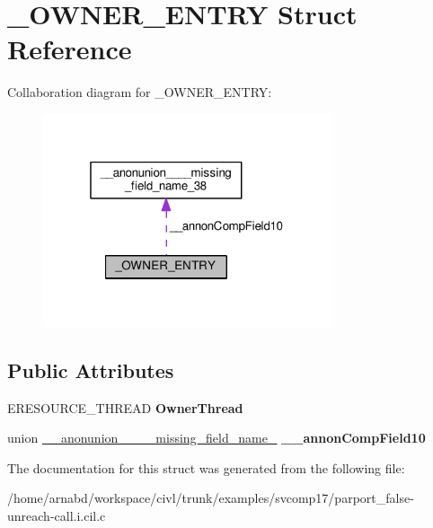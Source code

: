 \hypertarget{struct__OWNER__ENTRY}{}\section{\+\_\+\+O\+W\+N\+E\+R\+\_\+\+E\+N\+T\+R\+Y Struct Reference}
\label{struct__OWNER__ENTRY}


Collaboration diagram for \+\_\+\+O\+W\+N\+E\+R\+\_\+\+E\+N\+T\+R\+Y\+:
\nopagebreak
\begin{figure}[H]
\begin{center}
\leavevmode
\includegraphics[width=241pt]{struct__OWNER__ENTRY__coll__graph}
\end{center}
\end{figure}
\subsection*{Public Attributes}
\begin{DoxyCompactItemize}
\item 
\hypertarget{struct__OWNER__ENTRY_a9a643b624d7b15df46770d736a0ffd9f}{}E\+R\+E\+S\+O\+U\+R\+C\+E\+\_\+\+T\+H\+R\+E\+A\+D {\bfseries Owner\+Thread}\label{struct__OWNER__ENTRY_a9a643b624d7b15df46770d736a0ffd9f}

\item 
\hypertarget{struct__OWNER__ENTRY_aa56c6eab1b1fa759e9bf161d0becbb75}{}union \hyperlink{union____anonunion________missing__field__name__38}{\+\_\+\+\_\+anonunion\+\_\+\+\_\+\+\_\+\+\_\+missing\+\_\+field\+\_\+name\+\_} {\bfseries \+\_\+\+\_\+annon\+Comp\+Field10}\label{struct__OWNER__ENTRY_aa56c6eab1b1fa759e9bf161d0becbb75}

\end{DoxyCompactItemize}


The documentation for this struct was generated from the following file\+:\begin{DoxyCompactItemize}
\item 
/home/arnabd/workspace/civl/trunk/examples/svcomp17/parport\+\_\+false-\/unreach-\/call.\+i.\+cil.\+c\end{DoxyCompactItemize}

